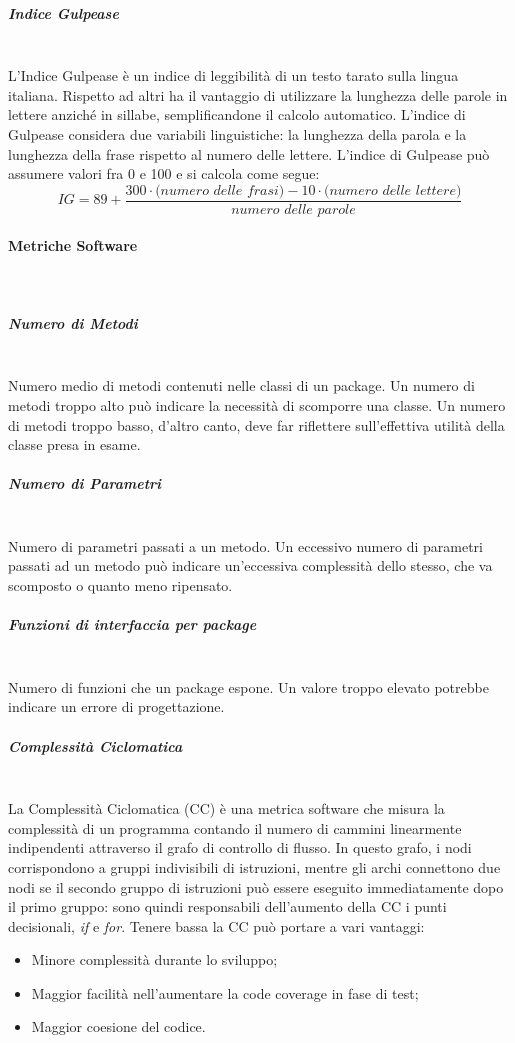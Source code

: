 \subparagraph{Indice Gulpease}\mbox{}\\
L'Indice Gulpease è un indice di leggibilità di un testo tarato sulla lingua italiana. Rispetto ad altri ha il vantaggio di utilizzare la lunghezza delle parole in lettere anziché in sillabe, semplificandone il calcolo automatico.
L'indice di Gulpease considera due variabili linguistiche: la lunghezza della parola e la lunghezza della frase rispetto al numero delle lettere.
L'indice di Gulpease può assumere valori fra 0 e 100 e si calcola come segue:
\[
IG = 89 + \frac{300 \cdot \textit{(numero delle frasi)} - 10 \cdot \textit{(numero delle lettere)}}{\textit{numero delle parole}}
\]

\paragraph{Metriche Software}\mbox{}\\
\subparagraph{Numero di Metodi}\mbox{}\\
Numero medio di metodi contenuti nelle classi di un package. Un numero di metodi troppo alto può indicare la necessità di scomporre una classe. Un numero di metodi troppo basso, d'altro canto, deve far riflettere sull'effettiva utilità della classe presa in esame.
\subparagraph{Numero di Parametri}\mbox{}\\
Numero di parametri passati a un metodo. Un eccessivo numero di parametri passati ad un metodo può indicare un'eccessiva complessità dello stesso, che va scomposto o quanto meno ripensato.
\subparagraph{Funzioni di interfaccia per package}\mbox{}\\
Numero di funzioni che un package espone. Un valore troppo elevato potrebbe indicare un errore di progettazione.
\subparagraph{Complessità Ciclomatica}\mbox{}\\
La Complessità Ciclomatica (CC) è una metrica software che misura la complessità di un programma contando il numero di cammini linearmente indipendenti attraverso il grafo di controllo di flusso. In questo grafo, i nodi corrispondono a gruppi indivisibili di istruzioni, mentre gli archi connettono due nodi se il secondo gruppo di istruzioni può essere eseguito immediatamente dopo il primo gruppo: sono quindi responsabili dell'aumento della CC i punti decisionali, \emph{if} e \emph{for}.
Tenere bassa la CC può portare a vari vantaggi:
\begin{itemize}
	\item Minore complessità durante lo sviluppo;
	\item Maggior facilità nell'aumentare la code coverage in fase di test;
	\item Maggior coesione del codice.
\end{itemize}

